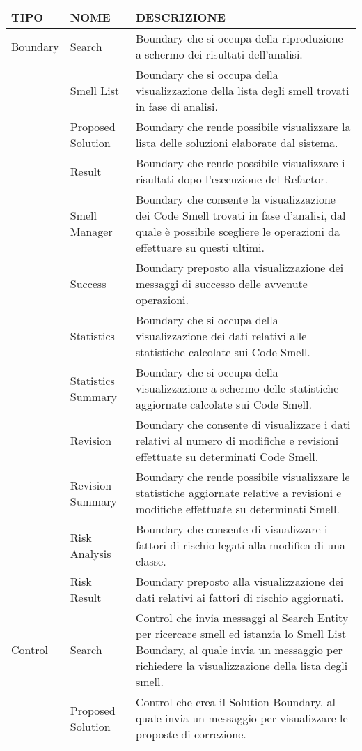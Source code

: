\begin{tabular}{|l|p{3.5cm}|p{11cm}|}
	
	\hline \textbf{TIPO} & \textbf{NOME} & \textbf{DESCRIZIONE} \\ \hline
	Boundary & Search & Boundary che si occupa della riproduzione a schermo dei risultati dell'analisi. \\ 
	& Smell List & Boundary che si occupa della visualizzazione della lista degli smell trovati in fase di analisi. \\
	& Proposed Solution & Boundary che rende possibile visualizzare la lista delle soluzioni elaborate dal sistema. \\ 
	& Result & Boundary che rende possibile visualizzare i risultati dopo l'esecuzione del Refactor. \\
	& Smell Manager & Boundary che consente la visualizzazione dei Code Smell trovati in fase d'analisi, dal quale è possibile scegliere le operazioni da effettuare su questi ultimi. \\
	& Success & Boundary preposto alla visualizzazione dei messaggi di successo delle avvenute operazioni. \\
	& Statistics & Boundary che si occupa della visualizzazione dei dati relativi alle statistiche calcolate sui Code Smell. \\ 
	& Statistics Summary & Boundary che si occupa della visualizzazione a schermo delle statistiche aggiornate calcolate sui Code Smell. \\ 
	& Revision & Boundary che consente di visualizzare i dati relativi al numero di modifiche e revisioni effettuate su determinati Code Smell. \\ 
	& Revision Summary & Boundary che rende possibile visualizzare le statistiche aggiornate relative a revisioni e modifiche effettuate su determinati Smell. \\
	& Risk Analysis & Boundary che consente di visualizzare i fattori di rischio legati alla modifica di una classe. \\ 
	& Risk Result & Boundary preposto alla visualizzazione dei dati relativi ai fattori di rischio aggiornati. \\ \hline
	Control & Search & Control che invia messaggi al Search Entity per ricercare smell ed istanzia lo Smell List Boundary, al quale invia un messaggio per richiedere la visualizzazione della lista degli smell.\\ 
	& Proposed Solution & Control che crea il Solution Boundary, al quale invia un messaggio per visualizzare le proposte di correzione. \\

\end{tabular}
